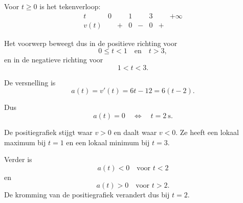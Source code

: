 \documentclass{ximera}
\begin{document}
\begin{oefening}{\oefU\ESS}
\begin{oplossing}
Voor $t\geq0$ is het tekenverloop:
\[
\begin{array}{c|ccccccc}
t & 0 & & 1 & & 3 & & +\infty\\ \hline
v(t) & & + & 0 & - & 0 & + &
\end{array}
\]

Het voorwerp beweegt dus in de positieve richting voor
\[
0\leq t<1
\quad\text{en}\quad
t>3,
\]
en in de negatieve richting voor
\[
1<t<3.
\]

De versnelling is
\[
a(t)=v'(t)=6t-12=6(t-2).
\]

Dus
\[
a(t)=0
\quad\Longleftrightarrow\quad
\boxed{t=2\ \mathrm{s}}.
\]

De positiegrafiek stijgt waar $v>0$ en daalt waar $v<0$. Ze heeft een lokaal
maximum bij $t=1$ en een lokaal minimum bij $t=3$.

Verder is
\[
a(t)<0 \quad \text{voor }t<2
\]
en
\[
a(t)>0 \quad \text{voor }t>2.
\]
De kromming van de positiegrafiek verandert dus bij $t=2$.

\end{oplossing}

\end{oefening}


\end{document}
